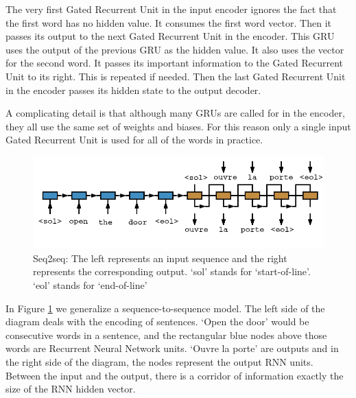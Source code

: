 The very first Gated Recurrent Unit in the input encoder ignores the fact that the first word has no hidden value. It consumes the first word vector. Then it passes its output to the next Gated Recurrent Unit in the encoder. This GRU uses the output of the previous GRU as the hidden value. It also uses the vector for the second word. It passes its important information to the Gated Recurrent Unit to its right. This is repeated if needed. Then the last Gated Recurrent Unit in the encoder passes its hidden state to the output decoder.

A complicating detail is that although many GRUs are called for in the encoder, they all use the same set of weights and biases. For this reason only a single input Gated Recurrent Unit is used for all of the words in practice. 


\begin{figure}[H]
	\begin{center}
		
		\includegraphics[scale=2]{diagram-nmt03}
		
	\end{center}
	\caption[Sequence-to-Sequence Architecture]{Seq2seq: The left represents an input sequence and the right represents the corresponding output. `sol' stands for `start-of-line'. `eol' stands for `end-of-line'}
	
	\label{diagram-s2s-overview}
	
\end{figure}


In Figure \ref{diagram-s2s-overview} we generalize a sequence-to-sequence model. The left side of the diagram deals with the encoding of sentences. `Open the door' would be consecutive words in a sentence, and the rectangular blue nodes above those words are Recurrent Neural Network units. `Ouvre la porte' are outputs and in the right side of the diagram, the nodes represent the output RNN units. Between the input and the output, there is a corridor of information exactly the size of the RNN hidden vector. 

